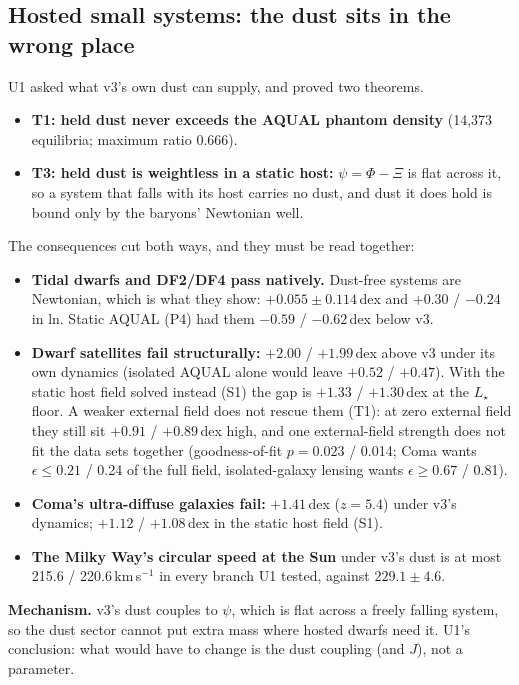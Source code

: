 \documentclass[10pt]{article}
\begin{document}
\subsection{Hosted small systems: the dust sits in the wrong place}
U1 asked what v3's own dust can supply, and proved two theorems.
\begin{itemize}
\item \textbf{T1: held dust never exceeds the AQUAL phantom density} (14,373 equilibria; maximum ratio 0.666).
\item \textbf{T3: held dust is weightless in a static host:} $\psi=\Phi-\Xi$ is flat across it, so a system that falls with its host carries no dust, and dust it does hold is bound only by the baryons' Newtonian well.
\end{itemize}
The consequences cut both ways, and they must be read together:
\begin{itemize}
\item \textbf{Tidal dwarfs and DF2/DF4 pass natively.} Dust-free systems are Newtonian, which is what they show: $+0.055\pm0.114$\,dex and $+0.30$ / $-0.24$ in ln. Static AQUAL (P4) had them $-0.59$ / $-0.62$\,dex below v3.
\item \textbf{Dwarf satellites fail structurally:} $+2.00$ / $+1.99$\,dex above v3 under its own dynamics (isolated AQUAL alone would leave $+0.52$ / $+0.47$). With the static host field solved instead (S1) the gap is $+1.33$ / $+1.30$\,dex at the $L_\star$ floor. A weaker external field does not rescue them (T1): at zero external field they still sit $+0.91$ / $+0.89$\,dex high, and one external-field strength does not fit the data sets together (goodness-of-fit $p=0.023$ / 0.014; Coma wants $\epsilon\le0.21$ / 0.24 of the full field, isolated-galaxy lensing wants $\epsilon\ge0.67$ / 0.81).
\item \textbf{Coma's ultra-diffuse galaxies fail:} $+1.41$\,dex ($z=5.4$) under v3's dynamics; $+1.12$ / $+1.08$\,dex in the static host field (S1).
\item \textbf{The Milky Way's circular speed at the Sun} under v3's dust is at most 215.6 / 220.6\,km\,s$^{-1}$ in every branch U1 tested, against $229.1\pm4.6$.
\end{itemize}
\textbf{Mechanism.} v3's dust couples to $\psi$, which is flat across a freely falling system, so the dust sector cannot put extra mass where hosted dwarfs need it. U1's conclusion: what would have to change is the dust coupling (and $J$), not a parameter.
\end{document}
